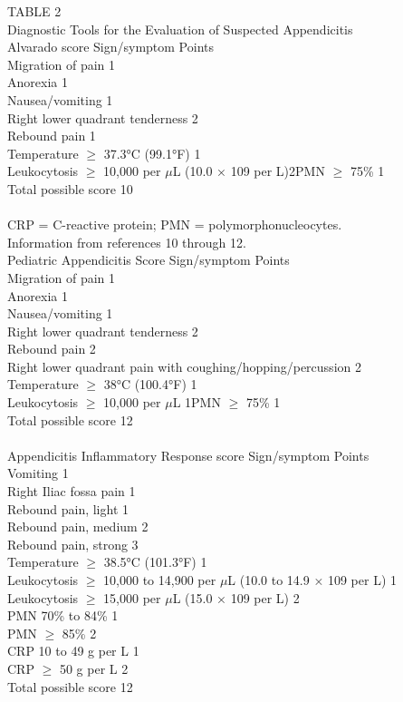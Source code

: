 \documentclass[bs, english]{stthesis}
\begin{document}
TABLE 2\\
Diagnostic Tools for the Evaluation of Suspected Appendicitis\\
Alvarado score  Sign/symptom Points\\
Migration of pain 1\\
Anorexia 1\\
Nausea/vomiting 1\\
Right lower quadrant tenderness 2\\
Rebound pain 1\\
Temperature $\ge$ 37.3°C (99.1°F) 1\\
Leukocytosis $\ge$ 10,000 per $\mu$L (10.0 × 109 per L)2PMN $\ge$ 75\% 1\\
Total possible score 10\\
\\
CRP = C-reactive protein;  PMN = polymorphonucleocytes.\\
Information from references 10 through 12.\\
Pediatric Appendicitis Score  Sign/symptom Points\\
Migration of pain 1\\
Anorexia 1\\
Nausea/vomiting 1\\
Right lower quadrant tenderness 2\\
Rebound pain 2\\
Right lower quadrant pain with coughing/hopping/percussion 2\\
Temperature $\ge$ 38°C (100.4°F) 1\\
Leukocytosis $\ge$ 10,000 per $\mu$L 1PMN $\ge$ 75\% 1\\
Total possible score 12\\
\\
Appendicitis Inflammatory Response score  Sign/symptom Points\\
Vomiting 1\\
Right Iliac fossa pain 1\\
Rebound pain, light 1\\
Rebound pain, medium 2\\
Rebound pain, strong 3\\
Temperature $\ge$ 38.5°C (101.3°F) 1\\
Leukocytosis $\ge$ 10,000 to 14,900 per $\mu$L (10.0 to 14.9 × 109 per L) 1\\
Leukocytosis $\ge$ 15,000 per $\mu$L (15.0 × 109 per L) 2\\
PMN 70\% to 84\% 1\\
PMN $\ge$ 85\% 2\\
CRP 10 to 49 g per L 1\\
CRP $\ge$ 50 g per L 2\\
Total possible score 12\\
\end{document}
